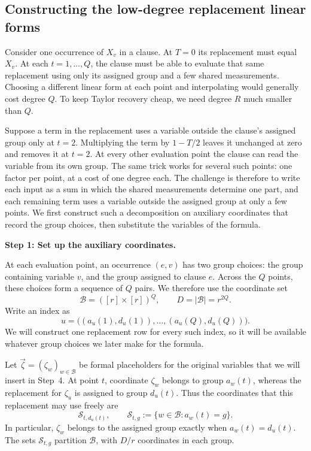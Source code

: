 \documentclass[11pt,reqno]{amsart}
\numberwithin{equation}{section}
\theoremstyle{definition}\newtheorem{definition}[theorem]{Definition}
\theoremstyle{remark}\newtheorem{remark}[theorem]{Remark}
\begin{document}
\subsection{Constructing the low-degree replacement linear forms}
\label{subsec:preview-auxiliary}
Consider one occurrence of $X_v$ in a clause. At $T=0$ its
replacement must equal $X_v$. At each $t=1,\ldots,Q$, the clause
must be able to evaluate that same replacement using only its
assigned group and a few shared measurements. Choosing a different
linear form at each point and interpolating would generally cost
degree $Q$. To keep Taylor recovery cheap, we need degree $R$
much smaller than $Q$.

Suppose a term in the replacement uses a variable outside the
clause's assigned group only at $t=2$. Multiplying the term by
$1-T/2$ leaves it unchanged at zero and removes it at $t=2$.
At every other evaluation point the clause can read the variable
from its own group. The same trick works for several such points:
one factor per point, at a cost of one degree each. The challenge
is therefore to write each input as a sum in which the shared
measurements determine one part, and each remaining term uses a
variable outside the assigned group at only a few points. We first
construct such a decomposition on auxiliary coordinates that record
the group choices, then substitute the variables of the formula.

\medskip\noindent
\textbf{Step 1: Set up the auxiliary coordinates.}\par\nobreak
\smallskip\noindent
At each evaluation point, an occurrence $(e,v)$ has two group
choices: the group containing variable $v$, and the group assigned
to clause $e$. Across the $Q$ points, these choices form a
sequence of $Q$ pairs. We therefore use the coordinate set
\[
 \mathcal B=([r]\times[r])^Q,\qquad D=|\mathcal B|=r^{2Q}.
\]
Write an index as
\[
 u=\bigl((a_u(1),d_u(1)),\ldots,(a_u(Q),d_u(Q))\bigr).
\]
We will construct one replacement row for every such index,
so it will be available whatever group choices we later make
for the formula.

Let $\vec\zeta=(\zeta_w)_{w\in\mathcal B}$ be formal placeholders
for the original variables that we will insert in Step~4.
At point $t$, coordinate $\zeta_w$ belongs to group $a_w(t)$,
whereas the replacement for $\zeta_u$ is assigned to group $d_u(t)$.
Thus the coordinates that this replacement may use freely are
\[
 \mathcal S_{t,d_u(t)},\qquad
 \mathcal S_{t,g}:=\{w\in\mathcal B:a_w(t)=g\}.
\]
In particular, $\zeta_w$ belongs to the assigned group exactly
when $a_w(t)=d_u(t)$. The sets $\mathcal S_{t,g}$ partition
$\mathcal B$, with $D/r$ coordinates in each group.
\end{document}
